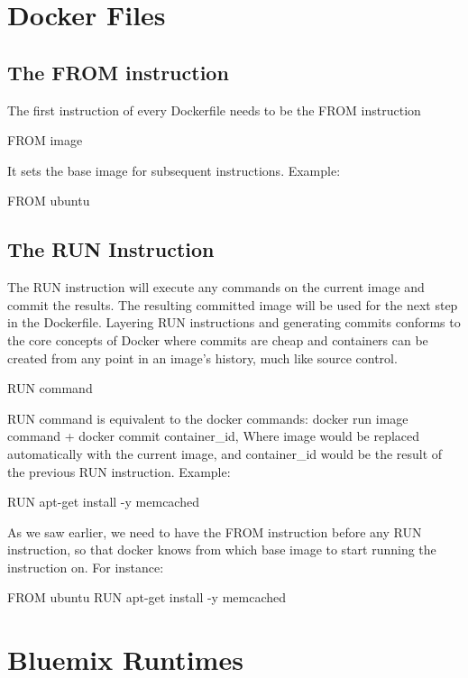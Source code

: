\documentclass[]{book}
\begin{document}

\chapter{Docker Files}
\label{sec:dockerfileschapter}

\section{The FROM instruction}
The first instruction of every Dockerfile needs to be the FROM instruction
\begin{code}
FROM image
\end{code}


It sets the base image for subsequent instructions.
Example:
\begin{code}
FROM ubuntu
\end{code}
\section{The RUN Instruction}

The RUN instruction will execute any commands on the current image and commit the results. The resulting committed image will be used for the next step in the Dockerfile.
Layering RUN instructions and generating commits conforms to the core concepts of Docker where commits are cheap and containers can be created from any point in an image’s history, much like source control.
\begin{code}
RUN command
\end{code}

RUN command is equivalent to the docker commands: docker run image command + docker commit container\_id, Where image would be replaced automatically with the current image, and container\_id would be the result of the previous RUN instruction.
Example:
\begin{code}
RUN apt-get install -y memcached
\end{code}

As we saw earlier, we need to have the FROM instruction before any RUN instruction, so that docker knows from which base image to start running the instruction on. For instance:
\begin{code}
FROM ubuntu
RUN apt-get install -y memcached
\end{code}

\chapter{Bluemix Runtimes}
\label{sec:runtimes}
\end{document}
